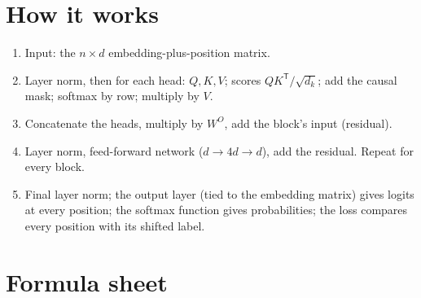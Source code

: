 \section{How it works}
\begin{enumerate}
  \item Input: the $n \times d$ embedding-plus-position matrix.
  \item Layer norm, then for each head: $Q, K, V$; scores $QK^{\mathsf T}/\sqrt{d_k}$; add the causal mask; softmax by row; multiply by $V$.
  \item Concatenate the heads, multiply by $W^O$, add the block's input (residual).
  \item Layer norm, feed-forward network ($d \to 4d \to d$), add the residual. Repeat for every block.
  \item Final layer norm; the output layer (tied to the embedding matrix) gives logits at every position; the softmax function gives probabilities; the loss compares every position with its shifted label.
\end{enumerate}

\section*{Formula sheet}

